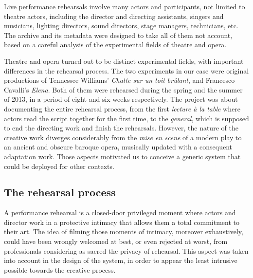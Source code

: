 \documentclass[conference]{IEEEtran}
\newcommand{\todo}[1]{\noindent\textcolor{red}{{\bf \{ToDo} #1{\bf \}}}}
\begin{document}
Live performance rehearsals involve many actors and participants, not limited to theatre actors,  including the director and  directing assistants, singers and musicians, lighting directors, sound directors, stage managers, technicians, etc. The archive and its metadata were designed to take all of them not account, based on a careful analysis of the experimental fields of 
theatre and opera.



Theatre and opera turned out to be distinct experimental fields, with important differences in the rehearsal process.  The two experiments in our case were original productions of  Tennessee Williams' \emph{Chatte sur un toit brûlant}, and Francesco Cavalli's \emph{Elena}. Both of them  were rehearsed during the spring and the summer of 2013, in a period of eight and six weeks respectively. The project was about documenting the entire rehearsal process, from the first \emph{lecture à la table} where actors read the script together for the first time, to the \emph{general}, which is supposed to end the directing work and finish the rehearsals. However, the nature of the creative work diverges considerably from the \emph{mise en scene} of a modern play to an ancient and obscure baroque opera, musically updated with a consequent adaptation work. Those aspects motivated us to conceive a generic system that could be deployed for other contexts.

\subsection{The rehearsal process}

A performance rehearsal is a closed-door privileged moment where actors and director work in a protective intimacy that allows them a total commitment to their art. The idea of filming those moments of intimacy, moreover exhaustively, could have been wrongly welcomed at best, or even rejected at worst, from professionals considering as sacred the privacy of rehearsal.
This aspect was taken into account in the design of the system, in order to appear the least intrusive possible towards the creative process.
\end{document}
